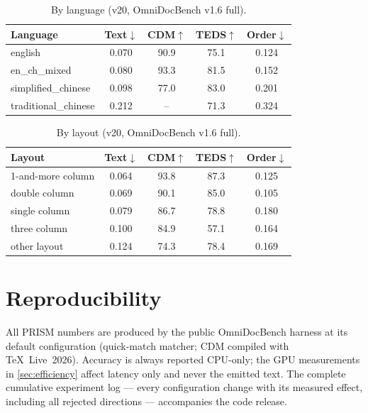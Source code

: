 \begin{table}[h]
\centering
\caption{By language (v20, OmniDocBench v1.6 full).}
\label{tab:suppl_lang}
\small
\setlength{\tabcolsep}{4pt}
\begin{tabular}{lcccc}
\toprule
Language & Text$\downarrow$ & CDM$\uparrow$ & TEDS$\uparrow$ & Order$\downarrow$ \\
\midrule
english              & 0.070 & 90.9 & 75.1 & 0.124 \\
en\_ch\_mixed        & 0.080 & 93.3 & 81.5 & 0.152 \\
simplified\_chinese  & 0.098 & 77.0 & 83.0 & 0.201 \\
traditional\_chinese & 0.212 & --   & 71.3 & 0.324 \\
\bottomrule
\end{tabular}
\end{table}

\begin{table}[h]
\centering
\caption{By layout (v20, OmniDocBench v1.6 full).}
\label{tab:suppl_layout}
\small
\setlength{\tabcolsep}{4pt}
\begin{tabular}{lcccc}
\toprule
Layout & Text$\downarrow$ & CDM$\uparrow$ & TEDS$\uparrow$ & Order$\downarrow$ \\
\midrule
1-and-more column & 0.064 & 93.8 & 87.3 & 0.125 \\
double column     & 0.069 & 90.1 & 85.0 & 0.105 \\
single column     & 0.079 & 86.7 & 78.8 & 0.180 \\
three column      & 0.100 & 84.9 & 57.1 & 0.164 \\
other layout      & 0.124 & 74.3 & 78.4 & 0.169 \\
\bottomrule
\end{tabular}
\end{table}

\section{Reproducibility}
\label{sec:suppl_repro}

All PRISM numbers are produced by the public OmniDocBench harness at its default configuration (quick-match matcher; CDM compiled with TeX~Live~2026). Accuracy is always reported CPU-only; the GPU measurements in \cref{sec:efficiency} affect latency only and never the emitted text. The complete cumulative experiment log --- every configuration change with its measured effect, including all rejected directions --- accompanies the code release.
